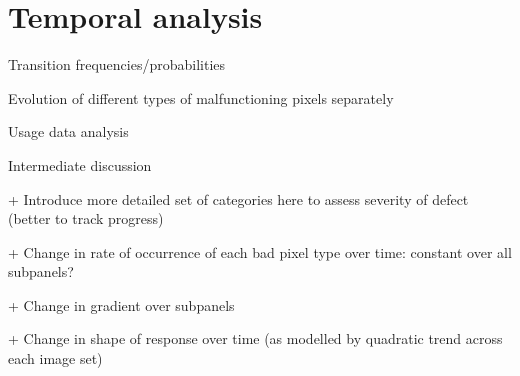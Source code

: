 \documentclass[../../IO-Pixels.tex]{subfiles}
\begin{document}
\section{Temporal analysis}
\begin{outline}

Transition frequencies/probabilities

Evolution of different types of malfunctioning pixels separately

Usage data analysis

Intermediate discussion

+ Introduce more detailed set of categories here to assess severity of defect (better to track progress)

+ Change in rate of occurrence of each bad pixel type over time: constant over all subpanels?

+ Change in gradient over subpanels

+ Change in shape of response over time (as modelled by quadratic trend across each image set)
\end{outline}
\end{document}
